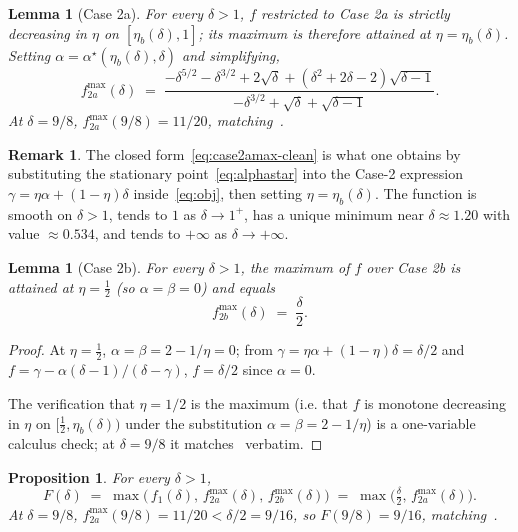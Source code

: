 \documentclass[11pt,a4paper]{article}
\newtheorem{lemma}[theorem]{Lemma}
\newtheorem{proposition}[theorem]{Proposition}
\theoremstyle{definition}
\newtheorem{remark}[theorem]{Remark}
\begin{document}
\begin{lemma}[Case 2a]\label{lem:case2a}
For every $\delta>1$, $f$ restricted to Case 2a is strictly decreasing
in $\eta$ on $[\eta_b(\delta),1]$; its maximum is therefore attained at
$\eta=\eta_b(\delta)$. Setting
$\alpha=\alpha^{\star}(\eta_b(\delta),\delta)$ and simplifying,
\begin{equation}\label{eq:case2amax-clean}
   f_{2a}^{\max}(\delta)
   \;=\;
   \frac{-\delta^{5/2}-\delta^{3/2}+2\sqrt{\delta}
         + (\delta^2+2\delta-2)\sqrt{\delta-1}}
        {-\delta^{3/2}+\sqrt{\delta}+\sqrt{\delta-1}}.
\end{equation}
At $\delta=9/8$, $f_{2a}^{\max}(9/8)=11/20$, matching~\cite[p.~10]{FPS}.
\end{lemma}

\begin{remark}\label{rem:case2a-form}
The closed form~\eqref{eq:case2amax-clean} is what one obtains by
substituting the stationary point~\eqref{eq:alphastar} into the Case-2
expression $\gamma=\eta\alpha+(1-\eta)\delta$ inside~\eqref{eq:obj},
then setting $\eta=\eta_b(\delta)$. The function is smooth on
$\delta>1$, tends to $1$ as $\delta\to1^+$, has a unique minimum near
$\delta\approx1.20$ with value $\approx 0.534$, and tends to $+\infty$
as $\delta\to+\infty$.
\end{remark}

\begin{lemma}[Case 2b]\label{lem:case2b}
For every $\delta>1$, the maximum of $f$ over Case 2b is attained at
$\eta=\tfrac12$ (so $\alpha=\beta=0$) and equals
\[
   f_{2b}^{\max}(\delta) \;=\; \frac{\delta}{2}.
\]
\end{lemma}

\begin{proof}
At $\eta=\tfrac12$, $\alpha=\beta=2-1/\eta=0$; from
$\gamma=\eta\alpha+(1-\eta)\delta=\delta/2$ and
$f=\gamma-\alpha(\delta-1)/(\delta-\gamma)$, $f=\delta/2$ since
$\alpha=0$.

The verification that $\eta=1/2$ is the maximum (i.e. that
$f$ is monotone decreasing in $\eta$ on $[\tfrac12,\eta_b(\delta))$
under the substitution $\alpha=\beta=2-1/\eta$) is a one-variable
calculus check; at $\delta=9/8$ it matches~\cite[p.~10]{FPS} verbatim.
\end{proof}

\begin{proposition}\label{prop:F-form}
For every $\delta>1$,
\[
   F(\delta) \;=\; \max\bigl(\,f_1(\delta),\,f_{2a}^{\max}(\delta),\,
                              f_{2b}^{\max}(\delta)\bigr)
            \;=\; \max\!\bigl(\tfrac{\delta}{2},\,f_{2a}^{\max}(\delta)\bigr).
\]
At $\delta=9/8$, $f_{2a}^{\max}(9/8)=11/20<\delta/2=9/16$, so $F(9/8)=9/16$,
matching~\cite[Claim 3.7]{FPS}.
\end{proposition}
\end{document}

